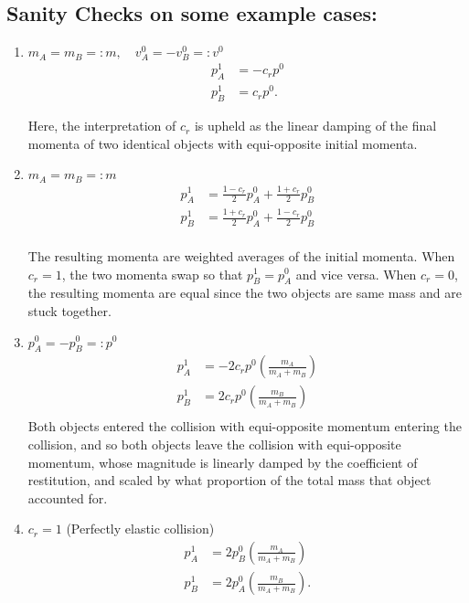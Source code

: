 \documentclass[a4paper,11pt, oneside]{article}
\newcommand{\mtot}{m_A + m_B}
\begin{document}
\subsection{Sanity Checks on some example cases:}
\begin{enumerate}
    \item $m_A = m_B =:m,\quad v_A^0 = -v_B^0 =: v^0$
\begin{align*}
    p_A^1 &= -c_r p^0\\
    p_B^1 &= c_r p^0.
\end{align*}
    
    Here, the interpretation of $c_r$ is upheld as the linear damping of the final momenta of two identical objects with equi-opposite initial momenta.
    
    \item $m_A = m_B =:m$
\begin{align*}
    p_A^1 &= \frac{1-c_r}{2}p_A^0 + \frac{1+c_r}{2}p_B^0\\
    p_B^1 &= \frac{1+c_r}{2}p_A^0 + \frac{1-c_r}{2}p_B^0\\
\end{align*}

The resulting momenta are weighted averages of the initial momenta.  When $c_r = 1$, the two momenta swap so that $p_B^1 = p_A^0$ and vice versa.  When $c_r = 0$, the resulting momenta are equal since the two objects are same mass and are stuck together.

    \item $p_A^0 = -p_B^0 =: p^0$
\begin{align*}
    p_A^1 &= -2c_rp^0\left(\frac{m_A}{m_A + m_B}\right)\\
    p_B^1 &= 2c_rp^0\left(\frac{m_B}{m_A + m_B}\right)\\
\end{align*}
Both objects entered the collision with equi-opposite momentum entering the collision, and so both objects leave the collision with equi-opposite momentum, whose magnitude is linearly damped by the coefficient of restitution, and scaled by what proportion of the total mass that object accounted for.

\item $c_r = 1$ (Perfectly elastic collision)
\begin{align*}
    p_A^1 &= 2p_B^0\left(\frac{m_A}{\mtot}\right)\\
    p_B^1 &= 2p_A^0\left(\frac{m_B}{\mtot}\right).
\end{align*}


\end{enumerate}
\end{document}
